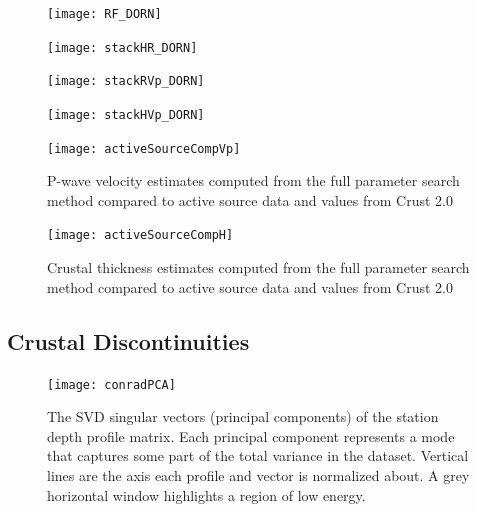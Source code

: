 \documentclass[draft, 12pt]{article}
\begin{document}
\begin{figure}
  \centering
  \texttt{[image: RF\_DORN]}
  \caption{}
  \label{fig:RF_DORN}
\end{figure}


\begin{figure}
  \centering
  \texttt{[image: stackHR\_DORN]}
  \caption{}
  \label{fig:HR_DORN}
\end{figure}

\begin{figure}
  \centering
  \texttt{[image: stackRVp\_DORN]}
  \caption{}
  \label{fig:RVp_DORN}
\end{figure}

\begin{figure}
  \centering
  \texttt{[image: stackHVp\_DORN]}
  \caption{}
  \label{fig:HVp_DORN}
\end{figure}

\begin{figure}
  \centering
  \texttt{[image: activeSourceCompVp]}
  \caption{P-wave velocity estimates computed from the full parameter search method compared to active source data and values from Crust 2.0}
  \label{fig:activeVp}
\end{figure}

\begin{figure}
  \centering
  \texttt{[image: activeSourceCompH]}
  \caption{Crustal thickness estimates computed from the full parameter search method compared to active source data and values from Crust 2.0}
  \label{fig:activeH}
\end{figure}


\subsection{Crustal Discontinuities}

\begin{figure}
  \centering
  \texttt{[image: conradPCA]}
  \caption{The SVD singular vectors (principal components) of the station depth profile matrix. Each principal component represents a mode that captures some part of the total variance in the dataset. Vertical lines are the axis each profile and vector is normalized about. A grey horizontal window highlights a region of low energy.}
  \label{fig:conradPCA}
\end{figure}
\end{document}
